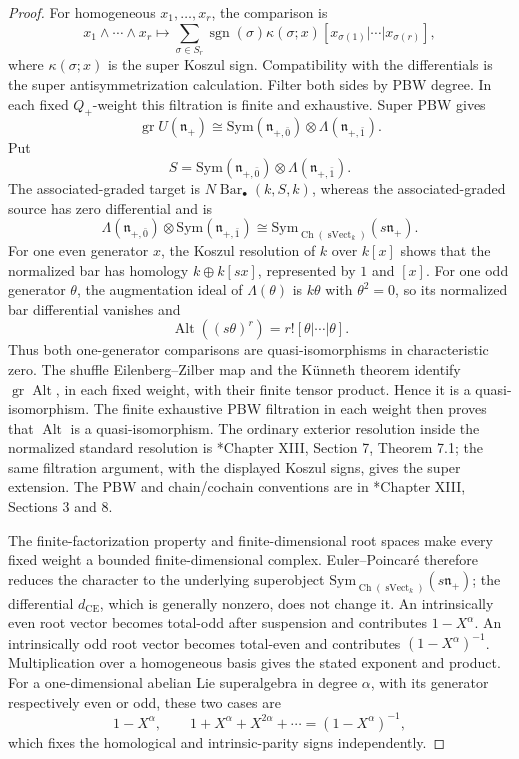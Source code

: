 \documentclass[11pt,reqno]{amsart}
\theoremstyle{definition}
\theoremstyle{remark}
\providecommand{\Sym}{\mathrm{Sym}}
\providecommand{\CE}{\mathrm{CE}}
\newcommand{\Barc}{\operatorname{Bar}}
\begin{document}
\begin{proof}
For homogeneous \(x_1,\ldots,x_r\), the comparison is
\[
 x_1\wedge\cdots\wedge x_r
 \longmapsto
 \sum_{\sigma\in S_r}
 \operatorname{sgn}(\sigma)\kappa(\sigma;x)
 [x_{\sigma(1)}|\cdots|x_{\sigma(r)}],
\]
where \(\kappa(\sigma;x)\) is the super Koszul sign.  Compatibility with
the differentials is the super antisymmetrization calculation.  Filter
both sides by PBW degree.  In each fixed \(Q_+\)-weight this filtration
is finite and exhaustive.  Super PBW gives
\[
 \operatorname{gr}U(\mathfrak n_+)
 \cong
 \Sym(\mathfrak n_{+,\bar0})
 \otimes\Lambda(\mathfrak n_{+,\bar1}).
\]
Put
\[
 S=\Sym(\mathfrak n_{+,\bar0})
   \otimes\Lambda(\mathfrak n_{+,\bar1}).
\]
The associated-graded target is \(N\Barc_\bullet(k,S,k)\), whereas the
associated-graded source has zero differential and is
\[
 \Lambda(\mathfrak n_{+,\bar0})
 \otimes\Sym(
   \mathfrak n_{+,\bar1})
 \cong
 \Sym_{\operatorname{Ch}(\operatorname{sVect}_k)}(s\mathfrak n_+).
\]
For one even generator \(x\), the Koszul resolution of \(k\) over
\(k[x]\) shows that the normalized bar has homology
\(k\oplus k[sx]\), represented by \(1\) and \([x]\).  For one odd
generator \(\theta\), the augmentation ideal of \(\Lambda(\theta)\) is
\(k\theta\) with \(\theta^2=0\), so its normalized bar differential
vanishes and
\[
 \operatorname{Alt}((s\theta)^r)
 =r![\theta|\cdots|\theta].
\]
Thus both one-generator comparisons are quasi-isomorphisms in
characteristic zero.  The shuffle Eilenberg--Zilber map and the
K\"unneth theorem identify \(\operatorname{gr}\operatorname{Alt}\), in
each fixed weight, with their finite tensor product.  Hence it is a
quasi-isomorphism.  The finite exhaustive PBW filtration in each weight
then proves that \(\operatorname{Alt}\) is a quasi-isomorphism.
The ordinary exterior resolution inside the normalized standard
resolution is
\cite{CE56}*{Chapter XIII, Section 7, Theorem 7.1}; the same filtration
argument, with the displayed Koszul signs, gives the super extension.
The PBW and chain/cochain conventions are in
\cite{CE56}*{Chapter XIII, Sections 3 and 8}.

The finite-factorization property and finite-dimensional root spaces
make every fixed weight a bounded finite-dimensional complex.
Euler--Poincaré therefore reduces the character to the underlying
superobject
\(\Sym_{\operatorname{Ch}(\operatorname{sVect}_k)}(s\mathfrak n_+)\);
the differential
\(d_{\CE}\), which is generally nonzero, does not change it.  An
intrinsically even root vector becomes total-odd after suspension and
contributes \(1-X^\alpha\).  An intrinsically odd root vector becomes
total-even and contributes \((1-X^\alpha)^{-1}\).  Multiplication over
a homogeneous basis gives the stated exponent and product.
For a one-dimensional abelian Lie superalgebra in degree \(\alpha\),
with its generator respectively even or odd, these two cases are
\[
 1-X^\alpha,\qquad
 1+X^\alpha+X^{2\alpha}+\cdots=(1-X^\alpha)^{-1},
\]
which fixes the homological and intrinsic-parity signs independently.
\end{proof}
\end{document}
